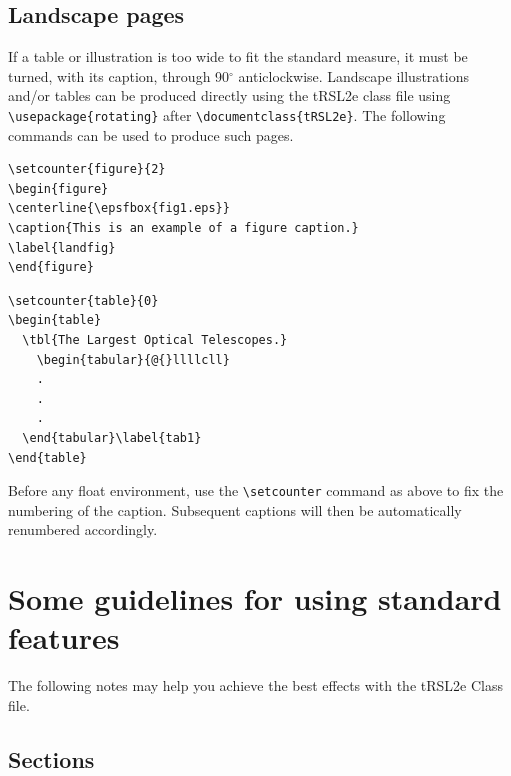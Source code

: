\documentclass[]{tRSL2e}
\begin{document}
\subsection{Landscape pages}\label{eps}

If a table or illustration is too wide to fit the standard measure, it must be turned, with its caption, through
90$^{\circ}$ anticlockwise. Landscape illustrations and/or tables can be produced directly using the tRSL2e class
file using \verb"\usepackage{rotating}" after \verb"\documentclass{tRSL2e}". The following commands can be used
to produce such pages.
%
\begin{verbatim}
\setcounter{figure}{2}
\begin{figure}
\centerline{\epsfbox{fig1.eps}}
\caption{This is an example of a figure caption.}
\label{landfig}
\end{figure}
\end{verbatim}
%
\begin{verbatim}
\setcounter{table}{0}
\begin{table}
  \tbl{The Largest Optical Telescopes.}
    \begin{tabular}{@{}llllcll}
    .
    .
    .
  \end{tabular}\label{tab1}
\end{table}
\end{verbatim}
%
Before any float environment, use the \verb"\setcounter" command
as above to fix the numbering of the caption. Subsequent captions
will then be automatically renumbered accordingly.


\section[]{Some guidelines for using standard features}

The following notes may help you achieve the best effects with the tRSL2e Class file.

\subsection{Sections}
\end{document}
